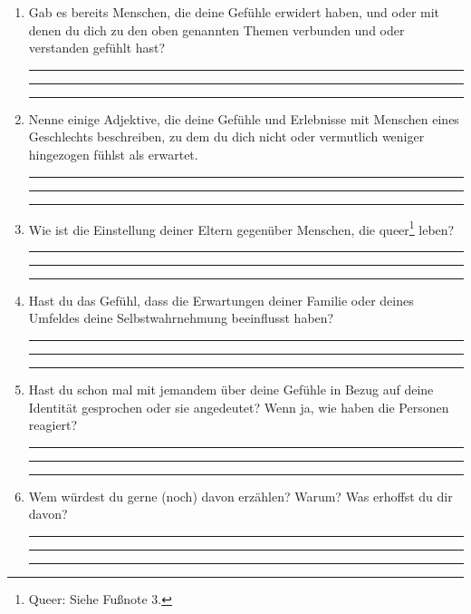 \documentclass[a4paper,12pt]{article}
\begin{document}
\begin{enumerate}[label=--]
    \item Gab es bereits Menschen, die deine Gefühle erwidert haben, und oder mit denen du dich zu den oben genannten Themen verbunden und oder verstanden gef\"uhlt hast?  

    \rule{12cm}{0.2pt}
    
    \rule{12cm}{0.2pt}
    
    \rule{12cm}{0.2pt}
    \item Nenne einige Adjektive, die deine Gefühle und Erlebnisse mit Menschen eines Geschlechts beschreiben, zu dem du dich nicht oder vermutlich weniger hingezogen fühlst als erwartet.  
      
    \rule{12cm}{0.2pt}
    
    \rule{12cm}{0.2pt}
    
    \rule{12cm}{0.2pt}
    
    \item Wie ist die Einstellung deiner Eltern gegenüber Menschen, die queer\footnote{Queer: Siehe Fußnote 3.} leben?  

    \rule{12cm}{0.2pt}
    
    \rule{12cm}{0.2pt}

    \rule{12cm}{0.2pt}
    
    \item Hast du das Gefühl, dass die Erwartungen deiner Familie oder deines Umfeldes deine Selbstwahrnehmung beeinflusst haben?  
   
    \rule{12cm}{0.2pt}
    
    \rule{12cm}{0.2pt}
    
    \rule{12cm}{0.2pt}
    
    \item Hast du schon mal mit jemandem über deine Gefühle in Bezug auf deine Identität gesprochen oder sie angedeutet? Wenn ja, wie haben die Personen reagiert?  
    
    \rule{12cm}{0.2pt}
    
    \rule{12cm}{0.2pt}
    
    \rule{12cm}{0.2pt}

    \item Wem würdest du gerne (noch) davon erzählen? Warum? Was erhoffst du dir davon?  

    \rule{12cm}{0.2pt}

    \rule{12cm}{0.2pt}
    
    \rule{12cm}{0.2pt}
    

\end{enumerate}
\end{document}

